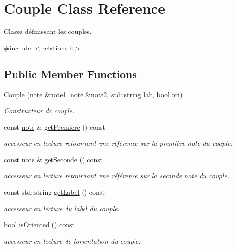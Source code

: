 \hypertarget{class_couple}{}\section{Couple Class Reference}
\label{class_couple}


Classe définissant les couples.  




{\ttfamily \#include $<$relations.\+h$>$}

\subsection*{Public Member Functions}
\begin{DoxyCompactItemize}
\item 
\hyperlink{class_couple_aa1f1400e92e062c0ecdd6f81fdc47d07}{Couple} (\hyperlink{classnote}{note} \&note1, \hyperlink{classnote}{note} \&note2, std\+::string lab, bool ori)
\begin{DoxyCompactList}\small\item\em Constructeur de couple. \end{DoxyCompactList}\item 
\mbox{\label{class_couple_a25c14d126cb78805740000253b32f6d7}} 
const \hyperlink{classnote}{note} \& \hyperlink{class_couple_a25c14d126cb78805740000253b32f6d7}{get\+Premiere} () const
\begin{DoxyCompactList}\small\item\em accesseur en lecture retournant une référence sur la première note du couple. \end{DoxyCompactList}\item 
\mbox{\label{class_couple_a837894fc5a70507b67c5c3f19da7b9da}} 
const \hyperlink{classnote}{note} \& \hyperlink{class_couple_a837894fc5a70507b67c5c3f19da7b9da}{get\+Seconde} () const
\begin{DoxyCompactList}\small\item\em accesseur en lecture retournant une référence sur la seconde note du couple. \end{DoxyCompactList}\item 
\mbox{\label{class_couple_acf2f8ba4907cf728a5d8110ac2abdff3}} 
const std\+::string \hyperlink{class_couple_acf2f8ba4907cf728a5d8110ac2abdff3}{get\+Label} () const
\begin{DoxyCompactList}\small\item\em accesseur en lecture du label du couple. \end{DoxyCompactList}\item 
\mbox{\label{class_couple_aa105334f2fa5185c963b54c265720f2e}} 
bool \hyperlink{class_couple_aa105334f2fa5185c963b54c265720f2e}{is\+Oriented} () const
\begin{DoxyCompactList}\small\item\em accesseur en lecture de l\textquotesingle{}orientation du couple. \end{DoxyCompactList}\end{DoxyCompactItemize}



